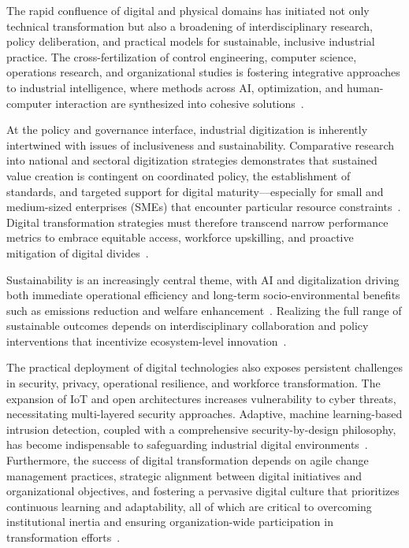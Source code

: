 \documentclass[sigconf]{acmart}
\begin{document}
The rapid confluence of digital and physical domains has initiated not only technical transformation but also a broadening of interdisciplinary research, policy deliberation, and practical models for sustainable, inclusive industrial practice. The cross-fertilization of control engineering, computer science, operations research, and organizational studies is fostering integrative approaches to industrial intelligence, where methods across AI, optimization, and human-computer interaction are synthesized into cohesive solutions~\cite{ref41}\cite{ref86}.

At the policy and governance interface, industrial digitization is inherently intertwined with issues of inclusiveness and sustainability. Comparative research into national and sectoral digitization strategies demonstrates that sustained value creation is contingent on coordinated policy, the establishment of standards, and targeted support for digital maturity—especially for small and medium-sized enterprises (SMEs) that encounter particular resource constraints~\cite{ref21}\cite{ref23}. Digital transformation strategies must therefore transcend narrow performance metrics to embrace equitable access, workforce upskilling, and proactive mitigation of digital divides~\cite{ref91}.

Sustainability is an increasingly central theme, with AI and digitalization driving both immediate operational efficiency and long-term socio-environmental benefits such as emissions reduction and welfare enhancement~\cite{ref90}. Realizing the full range of sustainable outcomes depends on interdisciplinary collaboration and policy interventions that incentivize ecosystem-level innovation~\cite{ref88}.

The practical deployment of digital technologies also exposes persistent challenges in security, privacy, operational resilience, and workforce transformation. The expansion of IoT and open architectures increases vulnerability to cyber threats, necessitating multi-layered security approaches. Adaptive, machine learning-based intrusion detection, coupled with a comprehensive security-by-design philosophy, has become indispensable to safeguarding industrial digital environments~\cite{ref10}\cite{ref92}. Furthermore, the success of digital transformation depends on agile change management practices, strategic alignment between digital initiatives and organizational objectives, and fostering a pervasive digital culture that prioritizes continuous learning and adaptability, all of which are critical to overcoming institutional inertia and ensuring organization-wide participation in transformation efforts~\cite{ref25}\cite{ref31}\cite{ref35}.
\end{document}
